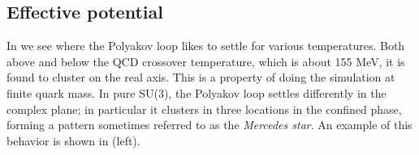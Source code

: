 \subsection{Effective potential}

In  we see where the Polyakov loop likes to settle for
various temperatures. Both above and below the QCD crossover temperature, which
is about 155 MeV, it is found to cluster on the real axis.
This is a property of doing the simulation at finite quark mass. In pure SU(3),
the Polyakov loop settles differently in the complex plane; in particular it
clusters in three locations in the confined phase, forming a pattern sometimes
referred to as the {\it Mercedes star}.
An example of this behavior is shown in  (left).





